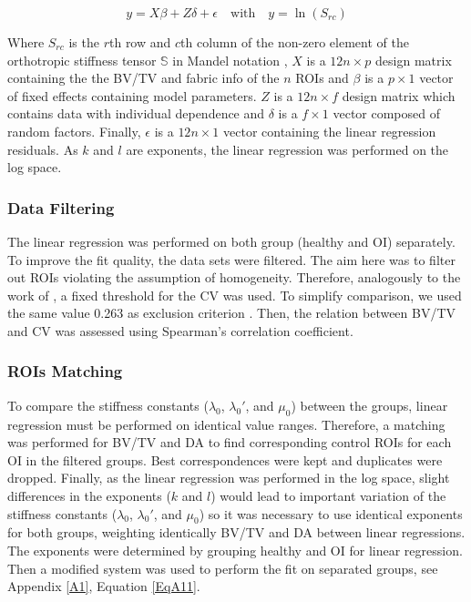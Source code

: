 \documentclass[a4paper,fleqn]{DC_ArtStyle}
\begin{document}
	\begin{equation}
	y = X \beta + Z \delta + \epsilon \quad \text{with} \quad y = \ln(S_{rc})
	\label{Eq204}
	\end{equation}
	
	Where $S_{rc}$ is the $r$th row and $c$th column of the non-zero element of the orthotropic stiffness tensor $\mathbb{S}$ in Mandel notation \cite{MANDEL1965}, $X$ is a $12 n \times p$ design matrix containing the the BV/TV and fabric info of the $n$ ROIs and $\beta$ is a $p \times 1$ vector of fixed effects containing model parameters. $Z$ is a $12 n \times f$ design matrix which contains data with individual dependence and $\delta$ is a $f \times 1$ vector composed of random factors. Finally, $\epsilon$ is a $12n \times 1$ vector containing the linear regression residuals. As $k$ and $l$ are exponents, the linear regression was performed on the log space.\\
	
	\subsubsection{Data Filtering}
	The linear regression was performed on both group (heal\-thy and OI) separately. To improve the fit quality, the data sets were filtered. The aim here was to filter out ROIs violating the assumption of homogeneity. Therefore, analogously to the work of \citeauthor{Panyasantisuk2015}\cite{Panyasantisuk2015}, a fixed threshold for the CV was used. To simplify comparison, we used the same value 0.263 as exclusion criterion \cite{Panyasantisuk2015}. Then, the relation between BV/TV and CV was assessed using Spearman's correlation coefficient. 
	
	\subsubsection{ROIs Matching}
	To compare the stiffness constants ($\lambda_0$, $\lambda_0'$, and $\mu_0$) between the groups, linear regression must be performed on identical value ranges. Therefore, a matching was performed for BV/TV and DA to find corresponding control ROIs for each OI in the filtered groups. Best correspondences were kept and duplicates were dropped. Finally, as the linear regression was performed in the log space, slight differences in the exponents ($k$ and $l$) would lead to important variation of the stiffness constants ($\lambda_0$, $\lambda_0'$, and $\mu_0$) so it was necessary to use identical exponents  for both groups, weighting identically BV/TV and DA between linear regressions. The exponents were determined by grouping healthy and OI for linear regression. Then a modified system was used to perform the fit on separated groups, see Appendix \ref{A1}, Equation \ref{EqA11}.\\
	
\end{document}
